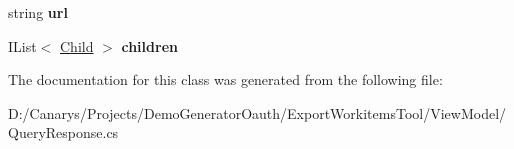 \begin{DoxyCompactItemize}
string {\bfseries url}
\item 
\mbox{\label{class_templates_generator_tool_1_1_view_model_1_1_query_response_1_1_child_aaf85db08ff26dd26421f13b312c426e9}} 
I\+List$<$ \mbox{\hyperlink{class_templates_generator_tool_1_1_view_model_1_1_query_response_1_1_child}{Child}} $>$ {\bfseries children}
\end{DoxyCompactItemize}


The documentation for this class was generated from the following file\+:\begin{DoxyCompactItemize}
\item 
D\+:/\+Canarys/\+Projects/\+Demo\+Generator\+Oauth/\+Export\+Workitems\+Tool/\+View\+Model/Query\+Response.\+cs\end{DoxyCompactItemize}
